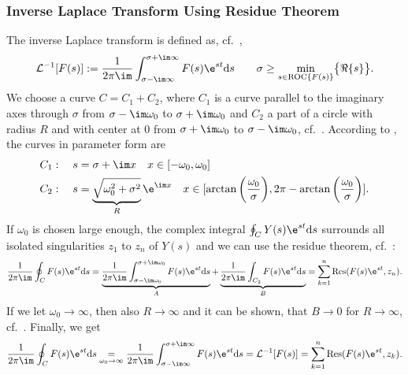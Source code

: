 \subsubsection{Inverse Laplace Transform Using Residue Theorem}
The inverse Laplace transform is defined as, cf.~\cite{UlrichWeber2017},
\begin{align}
\mathcal{L}^{-1}[F(s)]:=\frac{1}{2\pi\im}\int_{\sigma-\im\infty}^{\sigma+\im\infty}F(s)\e^{st}\mathrm{d}s\quad\quad \sigma \geq \underset{s \in \mathrm{ROC} \{ F(s) \} }{\min}\big \{ \Re \{ s \} \big \}.
\end{align}
%
We choose a curve $C = C_1 + C_2$, where $C_1$ is a curve parallel to the imaginary axes through $\sigma$ from $\sigma -\im\omega_0$ to $\sigma + \im\omega_0$ and $C_2$ a part of a circle with radius $R$ and with center at $0$ from $\sigma +\im\omega_0$ to $\sigma - \im\omega_0$, cf.~\cite{UlrichWeber2017}.
According to \cite[Fig.~3.5]{UlrichWeber2017}, the curves in parameter form are
\begin{align}
	&C_1:\quad s = \sigma+\im x \quad x \in [-\omega_0,\omega_0] \\
	&C_2:\quad s = \underbrace{\sqrt{\omega_0^2+\sigma^2}}_R \e^{\im x} \quad x \in [\arctan\bigg (\frac{\omega_0}{\sigma}\bigg ) ,2\pi-\arctan\bigg ( \frac{\omega_0}{\sigma}\bigg ) ].
\end{align}
%
If $\omega_0$ is chosen large enough, the complex integral $\oint_CY(s)\e^{st}\mathrm{d}s$ surrounds all isolated singularities $z_1$ to $z_n$ of $Y(s)$ and we can use the residue theorem, cf.~\cite{UlrichWeber2017}:
\begin{align}
	\frac{1}{2\pi\im}\oint_C F(s)\e^{st}\mathrm{d}s=\underbrace{\frac{1}{2\pi\im}\int_{\sigma-\im\omega_0}^{\sigma+\im\omega_0}F(s)\e^{st}\mathrm{d}s}_{A}+\underbrace{\frac{1}{2\pi\im}\int_{C_2}F(s)\e^{st}\mathrm{d}s}_{B}=\sum_{k=1}^{n}\mathrm{Res}(F(s)\e^{st},z_n).
\end{align}
%
If we let $\omega_0\rightarrow\infty$, then also $R\rightarrow\infty$ and it can be shown, that $B \rightarrow 0$ for $R\rightarrow \infty$, cf.~\cite{UlrichWeber2017}.
%
Finally, we get
\begin{align}
\label{eq:InvLaplace2ResidueTheorem}
	\frac{1}{2\pi\im}\oint_C F(s)\e^{st}\mathrm{d}s\underset{\omega_0\rightarrow\infty}{=}\frac{1}{2\pi\im}\int_{\sigma-\im\infty}^{\sigma+\im\infty}F(s)\e^{st}\mathrm{d}s=\mathcal{L}^{-1}[F(s)]=\sum_{k=1}^{n}\mathrm{Res}(F(s)\e^{st},z_k).
\end{align}

